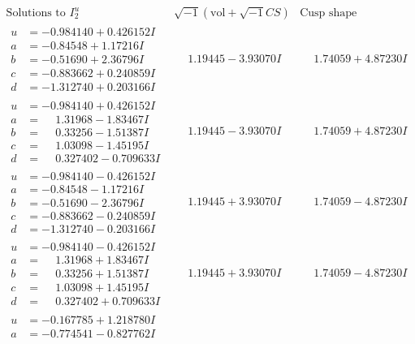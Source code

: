 \documentclass[1p]{elsarticle_modified}
\theoremstyle{definition}
\newcommand{\I}{\sqrt{-1}}
\begin{document}
$$\begin{array}{c|c|c}  
\text{Solutions to }I^u_{2}& \I (\text{vol} + \sqrt{-1}CS) & \text{Cusp shape}\\
 \hline 
\begin{aligned}
u &= -0.984140 + 0.426152 I \\
a &= -0.84548 + 1.17216 I \\
b &= -0.51690 + 2.36796 I \\
c &= -0.883662 + 0.240859 I \\
d &= -1.312740 + 0.203166 I\end{aligned}
 & \phantom{-}1.19445 - 3.93070 I & \phantom{-}1.74059 + 4.87230 I \\ \hline\begin{aligned}
u &= -0.984140 + 0.426152 I \\
a &= \phantom{-}1.31968 - 1.83467 I \\
b &= \phantom{-}0.33256 - 1.51387 I \\
c &= \phantom{-}1.03098 - 1.45195 I \\
d &= \phantom{-}0.327402 - 0.709633 I\end{aligned}
 & \phantom{-}1.19445 - 3.93070 I & \phantom{-}1.74059 + 4.87230 I \\ \hline\begin{aligned}
u &= -0.984140 - 0.426152 I \\
a &= -0.84548 - 1.17216 I \\
b &= -0.51690 - 2.36796 I \\
c &= -0.883662 - 0.240859 I \\
d &= -1.312740 - 0.203166 I\end{aligned}
 & \phantom{-}1.19445 + 3.93070 I & \phantom{-}1.74059 - 4.87230 I \\ \hline\begin{aligned}
u &= -0.984140 - 0.426152 I \\
a &= \phantom{-}1.31968 + 1.83467 I \\
b &= \phantom{-}0.33256 + 1.51387 I \\
c &= \phantom{-}1.03098 + 1.45195 I \\
d &= \phantom{-}0.327402 + 0.709633 I\end{aligned}
 & \phantom{-}1.19445 + 3.93070 I & \phantom{-}1.74059 - 4.87230 I \\ \hline\begin{aligned}
u &= -0.167785 + 1.218780 I \\
a &= -0.774541 - 0.827762 I \\

\end{aligned}
\end{array}$$
\end{document}
